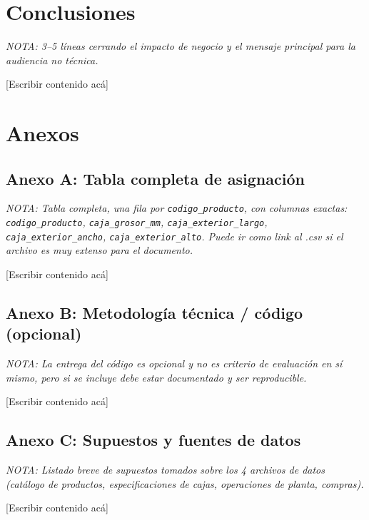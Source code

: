 \documentclass[11pt]{article}
\newcommand{\nota}[1]{{\itshape\color{notegray}\small NOTA: #1}\par\vspace{2pt}}
\newcommand{\placeholder}{\color{placeholdergray}[Escribir contenido acá]\color{black}\par\vspace{6pt}}
\begin{document}
\section{Conclusiones}
\nota{3--5 líneas cerrando el impacto de negocio y el mensaje principal para la audiencia no técnica.}
\placeholder

\newpage

\section*{Anexos}

\subsection*{Anexo A: Tabla completa de asignación}
\nota{Tabla completa, una fila por \texttt{codigo\_producto}, con columnas exactas: \texttt{codigo\_producto}, \texttt{caja\_grosor\_mm}, \texttt{caja\_exterior\_largo}, \texttt{caja\_exterior\_ancho}, \texttt{caja\_exterior\_alto}. Puede ir como link al .csv si el archivo es muy extenso para el documento.}
\placeholder

\subsection*{Anexo B: Metodología técnica / código (opcional)}
\nota{La entrega del código es opcional y no es criterio de evaluación en sí mismo, pero si se incluye debe estar documentado y ser reproducible.}
\placeholder

\subsection*{Anexo C: Supuestos y fuentes de datos}
\nota{Listado breve de supuestos tomados sobre los 4 archivos de datos (catálogo de productos, especificaciones de cajas, operaciones de planta, compras).}
\placeholder
\end{document}
